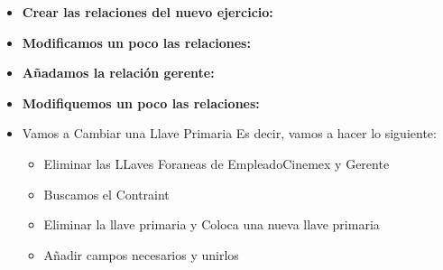 \documentclass[12pt, fleqn]{article}                             %
\begin{document}
    \begin{itemize}

        \item
            \textbf{Crear las relaciones del nuevo ejercicio:}
            \lstset{basicstyle=\tiny}
            

        \item
            \textbf{Modificamos un poco las relaciones:}
            \lstset{basicstyle=\tiny}
            

        \item
            \textbf{Añadamos la relación gerente:}
            \lstset{basicstyle=\tiny}
            

        \item
            \textbf{Modifiquemos un poco las relaciones:}
            \lstset{basicstyle=\tiny}
            
            
        \clearpage
        \item{Vamos a Cambiar una Llave Primaria}
            Es decir, vamos a hacer lo siguiente:
            
            \begin{itemize}
                \item
                    Eliminar las LLaves Foraneas de EmpleadoCinemex y Gerente

                    \lstset{basicstyle=\tiny}
                    

                \item
                    Buscamos el Contraint

                    \lstset{basicstyle=\tiny}
                    

                    \lstset{basicstyle=\tiny}
                    


                \item
                    Eliminar la llave primaria y Coloca una nueva llave primaria

                    \lstset{basicstyle=\tiny}
                    

                \item
                    Añadir campos necesarios y unirlos


\end{itemize}
\end{itemize}
\end{document}
